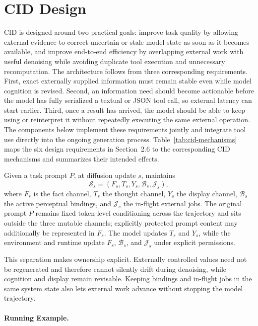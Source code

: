 \section{CID Design}
\label{sec:method}

CID is designed around two practical goals: improve task quality by allowing external evidence to correct uncertain or stale model state as soon as it becomes available, and improve end-to-end efficiency by overlapping external work with useful denoising while avoiding duplicate tool execution and unnecessary recomputation. The architecture follows from three corresponding requirements. First, exact externally supplied information must remain stable even while model cognition is revised. Second, an information need should become actionable before the model has fully serialized a textual or JSON tool call, so external latency can start earlier. Third, once a result has arrived, the model should be able to keep using or reinterpret it without repeatedly executing the same external operation. The components below implement these requirements jointly and integrate tool use directly into the ongoing generation process. Table~\ref{tab:cid-mechanisms} maps the six design requirements in Section~2.6 to the corresponding CID mechanisms and summarizes their intended effects.

Given a task prompt $P$, at diffusion update $s$, \cid maintains
\begin{equation}
  \mathcal{S}_s = (F_s, T_s, Y_s, \mathcal{B}_s, \mathcal{J}_s),
  \label{eq:cid-state}
\end{equation}
where $F_s$ is the fact channel, $T_s$ the thought channel, $Y_s$ the display channel, $\mathcal{B}_s$ the active perceptual bindings, and $\mathcal{J}_s$ the in-flight external jobs. The original prompt $P$ remains fixed token-level conditioning across the trajectory and sits outside the three mutable channels; explicitly protected prompt content may additionally be represented in $F_s$. The model updates $T_s$ and $Y_s$, while the environment and runtime update $F_s$, $\mathcal{B}_s$, and $\mathcal{J}_s$ under explicit permissions.

This separation makes ownership explicit. Externally controlled values need not be regenerated and therefore cannot silently drift during denoising, while cognition and display remain revisable. Keeping bindings and in-flight jobs in the same system state also lets external work advance without stopping the model trajectory.

\paragraph{Running Example.}

